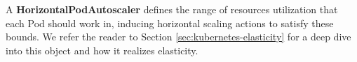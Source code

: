 A \textbf{HorizontalPodAutoscaler} defines the range of resources utilization that each Pod should work in, inducing horizontal scaling actions to satisfy these bounds.
%
We refer the reader to Section \ref{sec:kubernetes-elasticity} for a deep dive into this object and how it realizes elasticity.










